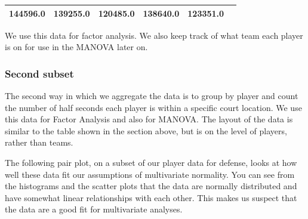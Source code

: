 \documentclass[]{article}
\begin{document}
\begin{longtable}[]{@{}llllll@{}}
\begin{minipage}[t]{0.14\columnwidth}
144596.0\strut
\end{minipage} & \begin{minipage}[t]{0.14\columnwidth}\raggedright
139255.0\strut
\end{minipage} & \begin{minipage}[t]{0.14\columnwidth}\raggedright
120485.0\strut
\end{minipage} & \begin{minipage}[t]{0.14\columnwidth}\raggedright
138640.0\strut
\end{minipage} & \begin{minipage}[t]{0.14\columnwidth}\raggedright
123351.0\strut
\end{minipage}\tabularnewline
\bottomrule
\end{longtable}

We use this data for factor analysis. We also keep track of what team
each player is on for use in the MANOVA later on.

\hypertarget{second-subset}{%
\subsubsection{Second subset}\label{second-subset}}

The second way in which we aggregate the data is to group by player and
count the number of half seconds each player is within a specific court
location. We use this data for Factor Analysis and also for MANOVA. The
layout of the data is similar to the table shown in the section above,
but is on the level of players, rather than teams.

The following pair plot, on a subset of our player data for defense,
looks at how well these data fit our assumptions of multivariate
normality. You can see from the histograms and the scatter plots that
the data are normally distributed and have somewhat linear relationships
with each other. This makes us suspect that the data are a good fit for
multivariate analyses.
\end{document}
